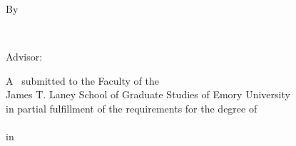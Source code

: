 
\vspace*{\fill}

\begin{singlespace}
    \begin{center}
        \mytitle
        
        \vspace{0.7in}
        
        By
        
        \vspace{0.7in}
        
        \myname\\
        \mypreviousdegrees
        
        \vspace{0.75in}
        
        Advisor: \advisor
        
        \vspace{2.5in}
        
        A \mydoctype~submitted to the Faculty of the\\
        James T. Laney School of Graduate Studies of Emory University\\
        in partial fulfillment of the requirements for the degree of \\
        \mydegree\\
        in \mydepartment\\
        \myyear
    \end{center}
\end{singlespace}

\vfill
\newpage
